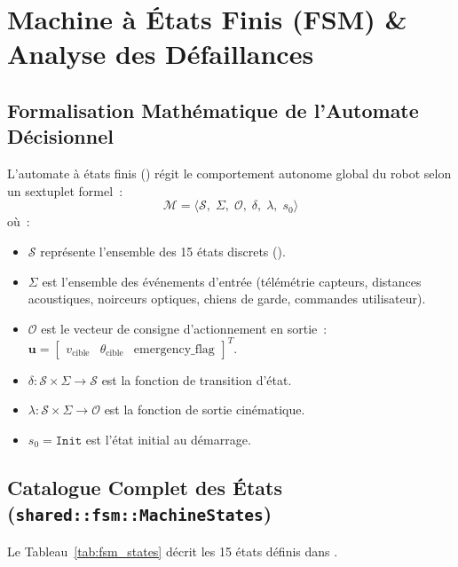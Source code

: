 \chapter{Machine à États Finis (FSM) \& Analyse des Défaillances}
\label{chap:fsm_failures}

\section{Formalisation Mathématique de l'Automate Décisionnel}
L'automate à états finis () régit le comportement autonome global du robot selon un sextuplet formel~:
\begin{equation}
    \mathcal{M} = \langle \mathcal{S}, \; \Sigma, \; \mathcal{O}, \; \delta, \; \lambda, \; s_0 \rangle
\end{equation}
où~:
\begin{itemize}
    \item $\mathcal{S}$ représente l'ensemble des 15 états discrets ().
    \item $\Sigma$ est l'ensemble des événements d'entrée (télémétrie capteurs, distances acoustiques, noirceurs optiques, chiens de garde, commandes utilisateur).
    \item $\mathcal{O}$ est le vecteur de consigne d'actionnement en sortie~: $\mathbf{u} = \begin{bmatrix} v_{\text{cible}} & \theta_{\text{cible}} & \text{emergency\_flag} \end{bmatrix}^T$.
    \item $\delta : \mathcal{S} \times \Sigma \to \mathcal{S}$ est la fonction de transition d'état.
    \item $\lambda : \mathcal{S} \times \Sigma \to \mathcal{O}$ est la fonction de sortie cinématique.
    \item $s_0 = \texttt{Init}$ est l'état initial au démarrage.
\end{itemize}

\section{Catalogue Complet des États (\texttt{shared::fsm::MachineStates})}
Le Tableau~\ref{tab:fsm_states} décrit les 15 états définis dans .

